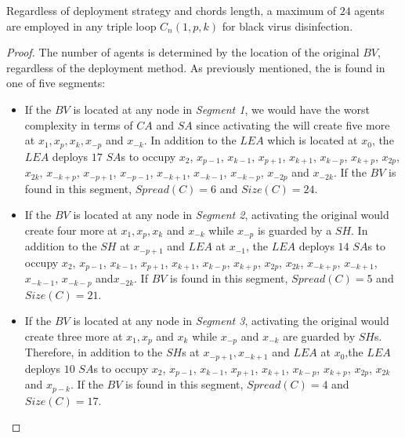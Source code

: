 \begin{theorem}

Regardless of deployment strategy and chords length, a maximum of $24$ agents are employed  in   any   triple loop $C_n(1,p,k)$ for black virus disinfection.
\end{theorem}
\begin{proof}
The number of agents is determined by the location of the original $BV$, regardless of the deployment method. As previously mentioned, the \bv is found in one of five segments:
\begin{itemize} 
\item 
If the $BV$ is located at any node in {\em Segment 1}, we would have the worst complexity in terms of $CA$ and $SA$ since activating the \bv will create five more \bvs at $x_{1},x_{p},x_{k},x_{-p}$  and $x_{-k}$. In addition to the $LEA$ which is located at $x_{0}$, the $LEA$ deploys $17$  $SA$s to occupy $x_{2}$, $ x_{p-1}$,  $x_{k-1}$, $x_{p+1}$, $x_{k+1}$, $x_{k-p}$, $x_{k+p}$, $x_{2p}$, $x_{2k}$, $x_{-k+p}$, $x_{-p+1}$, $x_{-p-1}$, $x_{-k+1}$, $x_{-k-1}$, $x_{-k-p}$, $x_{-2p}$ and $x_{-2k}$. If the $BV$ is found in this segment, $Spread(C)=6$ and $Size(C)=24$.  
 
\item If the $BV$ is located at any node in {\em Segment 2}, activating the original \bv would create four more \bvs at $x_{1},x_{p},x_{k}$ and $x_{-k}$ while $x_{-p}$ is guarded by a $SH$. In addition to the $SH$ at $x_{-p+1}$ and $LEA$ at $x_{-1}$, the $LEA$ deploys $14$  $SA$s to occupy $x_{2}$, $x_{p-1}$,  $x_{k-1}$, $x_{p+1}$, $x_{k+1}$, $x_{k-p}$, $x_{k+p}$, $x_{2p}$, $x_{2k}$, $x_{-k+p}$, $x_{-k+1}$, $x_{-k-1}$, $x_{-k-p}$ and$x_{-2k}$. If $BV$ is found in this segment, $Spread(C)=5$ and $Size(C)=21$.   

\item If the $BV$ is located at any node in {\em Segment 3}, activating the original \bv would create three more \bvs at $x_{1},x_{p}$ and $x_{k}$ while $x_{-p}$ and $x_{-k}$ are guarded by $SH$s. Therefore, in addition to the $SH$s at $x_{-p+1},x_{-k+1}$ and $LEA$ at $x_{0}$,the $LEA$ deploys $10$  $SA$s to occupy $x_{2}$, $x_{p-1}$, $x_{k-1}$, $x_{p+1}$, $x_{k+1}$, $x_{k-p}$, $x_{k+p}$, $x_{2p}$, $x_{2k}$ and $x_{p-k}$. If the $BV$ is found in this segment, $Spread(C)=4$ and $Size(C)=17$.   
 

\end{itemize}
\end{proof}
